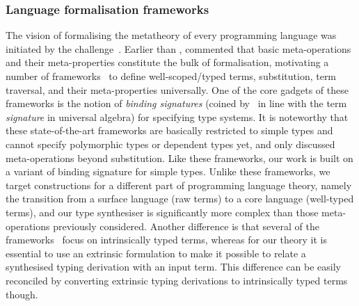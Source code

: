 

\subsubsection{Language formalisation frameworks}
\label{sec:language-formalisation}

The vision of formalising the metatheory of every programming language was initiated by the \PoplMark challenge~\citep{Aydemir2005}.
Earlier than \PoplMark, \citet{Altenkirch1993} commented that basic meta-operations and their meta-properties constitute the bulk of formalisation, motivating a number of frameworks~\citep{Ahrens2018,Fiore2022,Gheri2020,Ahrens2022,Allais2021} to define well-scoped/typed terms, substitution, term traversal, and their meta-properties universally.
One of the core gadgets of these frameworks is the notion of \emph{binding signatures} (coined by~\citet{Aczel1978} in line with the term \emph{signature} in universal algebra) for specifying type systems.
It is noteworthy that these state-of-the-art frameworks are basically restricted to simple types and cannot specify polymorphic types or dependent types yet, and only \citeauthor{Allais2021} discussed meta-operations beyond substitution.
Like these frameworks, our work is  built on a variant of binding signature for simple types.
Unlike these frameworks, we target constructions for a different part of programming language theory, namely the transition from a surface language (raw terms) to a core language (well-typed terms), and our type synthesiser is significantly more complex than those meta-operations previously considered.
Another difference is that several of the frameworks~\citep{Fiore2022,Allais2021,Ahrens2022} focus on intrinsically typed terms, whereas for our theory it is essential to use an extrinsic formulation to make it possible to relate a synthesised typing derivation with an input term.
This difference can be easily reconciled by converting extrinsic typing derivations to intrinsically typed terms though.

